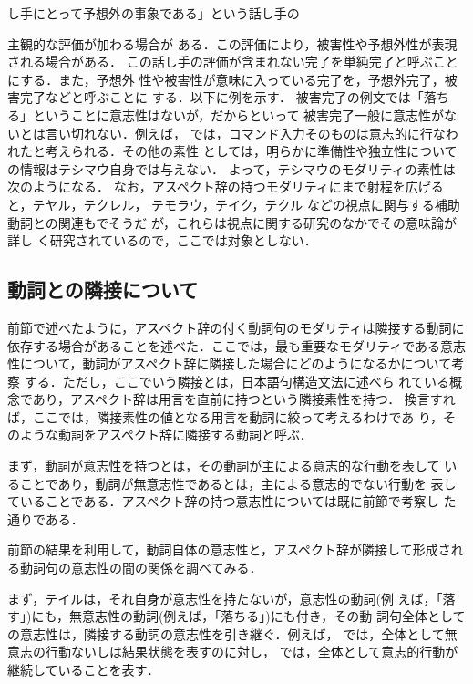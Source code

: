 し手にとって予想外の事象である」という話し手の{主観的な評価が加わる場合が
ある．この評価により，被害性や予想外性が表現される場合がある．
この話し手の評価が含まれない完了を単純完了と呼ぶことにする．また，予想外
性や被害性が意味に入っている完了を，予想外完了，被害完了などと呼ぶことに
する．以下に例を示す．
被害完了の例文では「落ちる」ということに意志性はないが，だからといって
被害完了一般に意志性がないとは言い切れない．例えば，
では，コマンド入力そのものは意志的に行なわれたと考えられる．その他の素性
としては，明らかに準備性や独立性についての情報はテシマウ自身では与えない．
よって，テシマウのモダリティの素性は次のようになる．
なお，アスペクト辞の持つモダリティにまで射程を広げると，テヤル，テクレル，
テモラウ，テイク，テクル などの視点に関与する補助動詞との関連もでそうだ
が，これらは視点に関する研究\cite{久野78,大江75}のなかでその意味論が詳し
く研究されているので，ここでは対象としない．

\subsection{動詞との隣接について}

前節で述べたように，アスペクト辞の付く動詞句のモダリティは隣接する動詞に
依存する場合があることを述べた．ここでは，最も重要なモダリティである意志
性について，動詞がアスペクト辞に隣接した場合にどのようになるかについて考察
する．ただし，ここでいう隣接とは，日本語句構造文法\cite{郡司94a}に述べら
れている概念であり，アスペクト辞は用言を直前に持つという隣接素性を持つ．
換言すれば，ここでは，隣接素性の値となる用言を動詞に絞って考えるわけであ
り，そのような動詞をアスペクト辞に隣接する動詞と呼ぶ．

まず，動詞が意志性を持つとは，その動詞が{\dg 主}による意志的な行動を表して
いることであり，動詞が無意志性であるとは，{\dg 主}による意志的でない行動を
表していることである．アスペクト辞の持つ意志性については既に前節で考察し
た通りである．

前節の結果を利用して，動詞自体の意志性と，アスペクト辞が隣接して形成され
る動詞句の意志性の間の関係を調べてみる．

まず，テイルは，それ自身が意志性を持たないが，意志性の動詞(例
えば，「落す」)にも，無意志性の動詞(例えば，「落ちる」)にも付き，その動
詞句全体としての意志性は，隣接する動詞の意志性を引き継ぐ．例えば，
では，全体として無意志の行動ないしは結果状態を表すのに対し，
では，全体として意志的行動が継続していることを表す．

}
